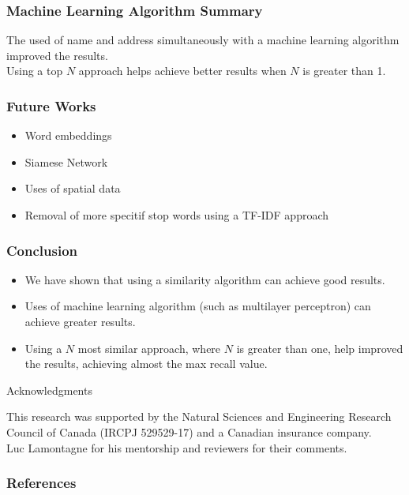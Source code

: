 \documentclass[aspectratio=169,10pt,xcolor=x11names,english,french]{beamer}
\begin{document}
	\begin{frame}\frametitle{Machine Learning Algorithm Summary}
		The used of name and address simultaneously with a machine learning algorithm improved the results. \\
		Using a top $ N $ approach helps achieve better results when $ N $ is greater than 1.
	\end{frame}

	\begin{frame}\frametitle{Future Works}
		\begin{itemize}
			\item Word embeddings \cite{word2vec, glove, wu2017starspace, name2vec, singh2019embedding}
			\item Siamese Network \cite{godbole2018siamese, 8967103}
			\item Uses of spatial data \cite{10.1145/1183471.1183486}
			\item Removal of more specitif stop words using a TF-IDF approach \cite{tfidf}
		\end{itemize}
	\end{frame}

	\begin{frame}\frametitle{Conclusion}
		\begin{itemize}
			\item We have shown that using a similarity algorithm can achieve good results.
			\item Uses of machine learning algorithm (such as multilayer perceptron) can achieve greater results.
			\item Using a $N$ most similar approach, where $N$ is greater than one, help improved the results, achieving almost the max recall value.
		\end{itemize}
	\end{frame}

	\begin{frame}{Acknowledgments}

		This research was supported by the Natural Sciences and Engineering Research Council of Canada (IRCPJ 529529-17) and a Canadian insurance company. 
		\\
		
		Luc Lamontagne for his mentorship and reviewers for their comments.
	\end{frame}
	
	

	\begin{frame}[t, allowframebreaks]
		\frametitle{References}
		
		
	\end{frame}
	
\end{document}
